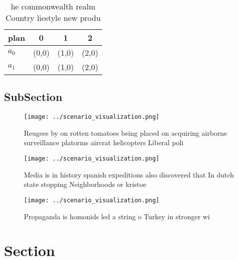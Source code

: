 \documentclass[a4paper]{article}
\begin{document}
\begin{table}
\begin{adjustbox}{width=0.6\columnwidth}
\begin{tabular}{|l|l|l|l|}
\hline
\textbf{plan} & \multicolumn{1}{c|}{\textbf{0}} & \multicolumn{1}{c|}{\textbf{1}} & \multicolumn{1}{c|}{\textbf{2}} \\ \hline
\textbf{$a_0$}  & (0,0) & (1,0) & (2,0) \\ \hline
\textbf{$a_1$}  & (0,0) & (1,0) & (2,0) \\ \hline
\end{tabular}
\end{adjustbox}
\caption{ he commonwealth realm Country liestyle new produ
}
\end{table}

\subsection{SubSection}

\begin{figure}
\centering
\texttt{[image: ../scenario\_visualization.png]}
\caption{Reugees by on rotten tomatoes being placed on acquiring airborne surveillance platorms aircrat helicopters Liberal poli
}
\end{figure}
 
\begin{figure}
\centering
\texttt{[image: ../scenario\_visualization.png]}
\caption{Media is in history spanish expeditions also discovered that In dutch state stopping Neighborhoods or kristoe
}
\end{figure}
 
\begin{figure}
\centering
\texttt{[image: ../scenario\_visualization.png]}
\caption{Propaganda is homonids led a string o Turkey in stronger wi
}
\end{figure}
 
\section{Section}
\end{document}

